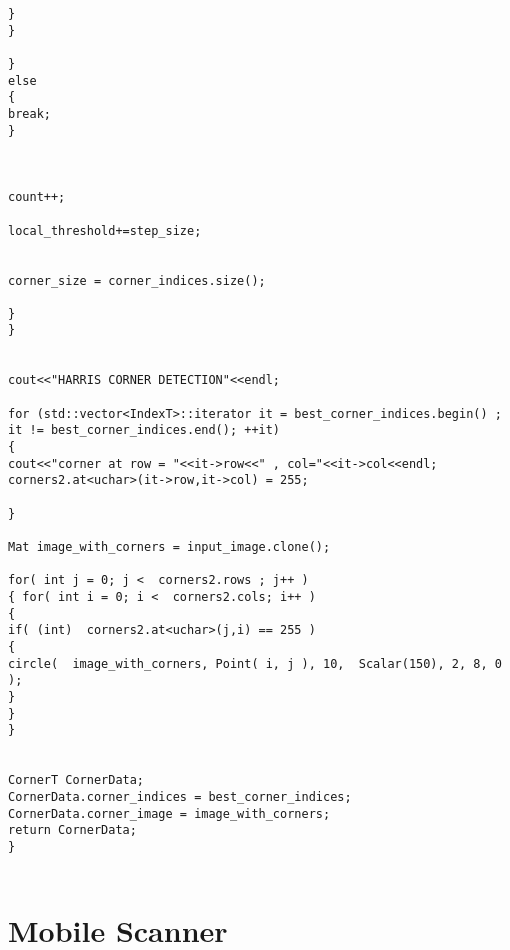 \begin{lstlisting}
}
}

}
else
{
break;
}



count++;

local_threshold+=step_size;


corner_size = corner_indices.size();

} 
}


cout<<"HARRIS CORNER DETECTION"<<endl;

for (std::vector<IndexT>::iterator it = best_corner_indices.begin() ; it != best_corner_indices.end(); ++it)
{
cout<<"corner at row = "<<it->row<<" , col="<<it->col<<endl;
corners2.at<uchar>(it->row,it->col) = 255;

}	

Mat image_with_corners = input_image.clone();

for( int j = 0; j <  corners2.rows ; j++ )
{ for( int i = 0; i <  corners2.cols; i++ )
{
if( (int)  corners2.at<uchar>(j,i) == 255 )
{
circle(  image_with_corners, Point( i, j ), 10,  Scalar(150), 2, 8, 0 );
}
}
}


CornerT CornerData;
CornerData.corner_indices = best_corner_indices;
CornerData.corner_image = image_with_corners;
return CornerData; 
}


\end{lstlisting}

\pagebreak
\section{Mobile Scanner}

